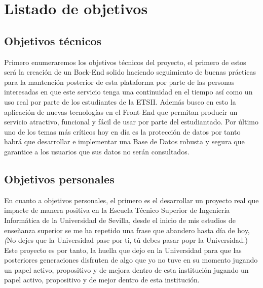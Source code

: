 \newpage
\section{Listado de objetivos}
\subsection{Objetivos técnicos}

Primero enumeraremos los objetivos técnicos del proyecto, el primero de estos será la creación de un  Back-End solido haciendo seguimiento de buenas prácticas para la mantención posterior de esta plataforma por parte de las personas interesadas en que este servicio tenga una continuidad en el tiempo así como un uso real por parte de los estudiantes de la ETSII. Además busco en esto la aplicación de nuevas tecnologías en el Front-End que permitan producir un servicio atractivo, funcional y fácil de usar por parte del estudiantado. Por último uno de los temas más críticos hoy en día es la protección de datos por tanto habrá que desarrollar e implementar una Base de Datos robusta y segura que garantice a los usuarios que sus datos no serán consultados.

\subsection{Objetivos personales}
En cuanto a objetivos personales, el primero es el desarrollar un proyecto real que impacte de manera positiva en la Escuela Técnico Superior de Ingeniería Informática de la Universidad de Sevilla, desde el inicio de mis estudios de enseñanza superior se me ha repetido una frase que abandero hasta día de hoy, \textit(No dejes que la Universidad pase por ti, tú debes pasar popr la Universidad.) Este proyecto es por tanto, la huella que dejo en la Universidad para que las posteriores generaciones disfruten de algo que yo no tuve en su momento jugando un papel activo, propositivo y de mejora dentro de esta institución jugando un papel activo, propositivo y de mejor dentro de esta institución.
